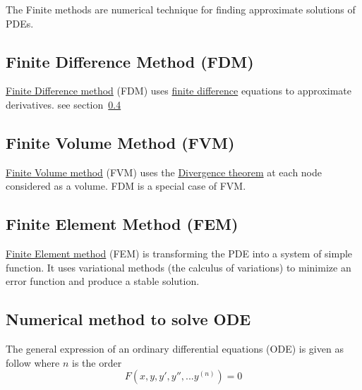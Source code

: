 \documentclass[11pt,a4paper]{report}
\begin{document}
The Finite methods are numerical technique for finding approximate solutions of PDEs.

\subsection{Finite Difference Method (FDM)} \href{https://en.wikipedia.org/wiki/Finite_difference}{Finite Difference method} (FDM) uses \href{http://en.wikipedia.org/wiki/Finite_difference}{finite difference} equations to approximate derivatives. see section~\ref{Numerical_method_to_solve_ODE}
\subsection{Finite Volume Method (FVM)} \href{https://en.wikipedia.org/wiki/Finite_volume_method}{Finite Volume method} (FVM) uses the \href{https://en.wikipedia.org/wiki/Divergence_theorem}{Divergence theorem} at each node considered as a volume. FDM is a special case of FVM.
\subsection{Finite Element Method (FEM)}
\href{https://en.wikipedia.org/wiki/Finite_element_method}{Finite Element method} (FEM) is transforming the PDE into a system of simple function. It uses variational methods (the calculus of variations) to minimize an error function and produce a stable solution.


\subsection{Numerical method to solve ODE}
\label{Numerical_method_to_solve_ODE}
The general expression of an ordinary differential equations (ODE) is given as follow where $n$ is the order
\begin{equation}
F(x,y,y',y'',...y^{(n)})=0
\end{equation}
\end{document}
